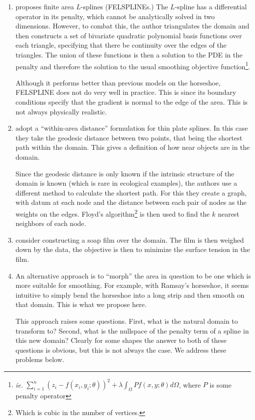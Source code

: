 \documentclass[a4paper,10pt]{amsart}
\begin{document}
\begin{enumerate}
\item \cite{ramsay} proposes finite area $L$-splines (FELSPLINEs.) The $L$-spline has a differential operator in its penalty, which cannot be analytically solved in two dimensions. However, to combat this, the author triangulates the domain and then constructs a set of bivariate quadratic polynomial basis functions over each triangle, specifying that there be continuity over the edges of the triangles. The union of these functions is then a solution to the PDE in the penalty and therefore the solution to the usual smoothing objective function\footnote{\emph{ie.} $\sum_{i=1}^n (z_i-f(x_i,y_i;\theta))^2 + \lambda \int_\Omega Pf(x,y;\theta)d\Omega$, where $P$  is some penalty operator}.

Although it performs better than previous models on the horseshoe, FELSPLINE does not do very well in practice. This is since its boundary conditions specify that the gradient is normal to the edge of the area. This is not always physically realistic.

\item \cite{wangranalli} adopt a ``within-area distance'' formulation for thin plate splines. In this case they take the geodesic distance between two points, that being the shortest path within the domain. This gives a definition of how near objects are in the domain.

Since the geodesic distance is only known if the intrinsic structure of the domain is known (which is rare in ecological examples), the authors use a different method to calculate the shortest path. For this they create a graph, with datum at each node and the distance between each pair of nodes as the weights on the edges. Floyd's algorithm\footnote{Which is cubic in the number of vertices.} is then used to find the $k$ nearest neighbors of each node.


\item \cite{soap} consider constructing a soap film over the domain. The film is then weighed down by the data, the objective is then to minimize the surface tension in the film.

\item An alternative approach is to ``morph'' the area in question to be one which is more suitable for smoothing. For example, with Ramsay's horseshoe, it seems intuitive to simply bend the horseshoe into a long strip and then smooth on that domain. This is what we propose here. 

This approach raises some questions. First, what is the natural domain to transform to? Second, what is the nullspace of the penalty term of a spline in this new domain? Clearly for some shapes the answer to both of these questions is obvious, but this is not always the case. We address these problems below.


\end{enumerate}
\end{document}
